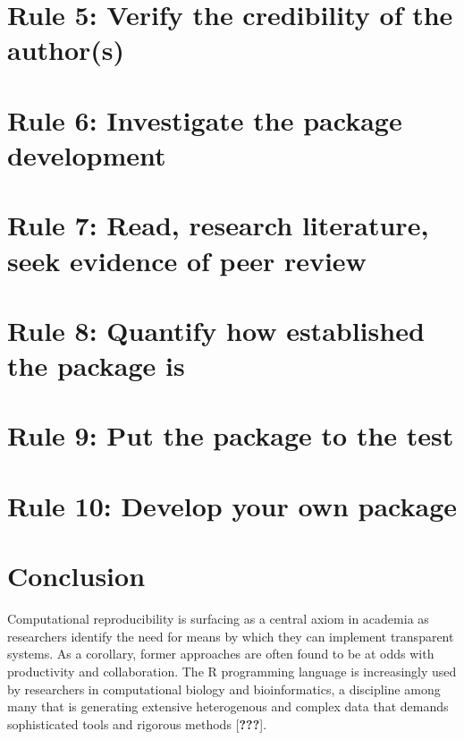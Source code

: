 \documentclass[10pt,letterpaper]{article}
\begin{document}
\hypertarget{rule-5-verify-the-credibility-of-the-authors}{%
\section{Rule 5: Verify the credibility of the
author(s)}\label{rule-5-verify-the-credibility-of-the-authors}}

\hypertarget{rule-6-investigate-the-package-development}{%
\section{Rule 6: Investigate the package
development}\label{rule-6-investigate-the-package-development}}

\hypertarget{rule-7-read-research-literature-seek-evidence-of-peer-review}{%
\section{Rule 7: Read, research literature, seek evidence of peer
review}\label{rule-7-read-research-literature-seek-evidence-of-peer-review}}

\hypertarget{rule-8-quantify-how-established-the-package-is}{%
\section{Rule 8: Quantify how established the package
is}\label{rule-8-quantify-how-established-the-package-is}}

\hypertarget{rule-9-put-the-package-to-the-test}{%
\section{Rule 9: Put the package to the
test}\label{rule-9-put-the-package-to-the-test}}

\hypertarget{rule-10-develop-your-own-package}{%
\section{Rule 10: Develop your own
package}\label{rule-10-develop-your-own-package}}

\hypertarget{conclusion}{%
\section{Conclusion}\label{conclusion}}

Computational reproducibility is surfacing as a central axiom in
academia as researchers identify the need for means by which they can
implement transparent systems. As a corollary, former approaches are
often found to be at odds with productivity and collaboration. The R
programming language is increasingly used by researchers in
computational biology and bioinformatics, a discipline among many that
is generating extensive heterogenous and complex data that demands
sophisticated tools and rigorous methods {[}{\textbf{???}}{]}.
\end{document}
